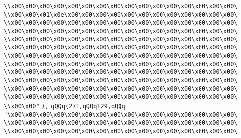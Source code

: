 \verb|\\x00\x00\x00\x00\x00\x00\x00\x00\x00\x00\x00\x00\x00\x00\x00\x00\|\newline
\verb|\\x00\x00\x01\x0e\x00\x00\x00\x00\x00\x00\x00\x00\x00\x00\x00\x00\|\newline
\verb|\\x00\x00\x00\x00\x00\x00\x00\x00\x00\x00\x00\x00\x00\x00\x00\x00\|\newline
\verb|\\x00\x00\x00\x00\x00\x00\x00\x00\x00\x00\x00\x00\x00\x00\x00\x00\|\newline
\verb|\\x00\x00\x00\x00\x00\x00\x00\x00\x00\x00\x00\x00\x00\x00\x00\x00\|\newline
\verb|\\x00\x00\x00\x00\x00\x00\x00\x00\x00\x00\x00\x00\x00\x00\x00\x00\|\newline
\verb|\\x00\x00\x00\x00\x00\x00\x00\x00\x00\x00\x00\x00\x00\x00\x00\x00\|\newline
\verb|\\x00\x00\x00\x00\x00\x00\x00\x00\x00\x00\x00\x00\x00\x00\x00\x00\|\newline
\verb|\\x00\x00\x00\x00\x00\x00\x00\x00\x00\x00\x00\x00\x00\x00\x00\x00\|\newline
\verb|\\x00\x00\x00\x00\x00\x00\x00\x00\x00\x00\x00\x00\x00\x00\x00\x00\|\newline
\verb|\\x00\x00\x00\x00\x00\x00\x00\x00\x00\x00\x00\x00\x00\x00\x00\x00\|\newline
\verb|\\x00\x00\x00\x00\x00\x00\x00\x00\x00\x00\x00\x00\x00\x00\x00\x00\|\newline
\verb|\\x00\x00"|\newline
\verb|),|\newline
\verb|qQQq(271,qQQq129,qQQq|\newline
\verb|"\x00\x00\x00\x00\x00\x00\x00\x00\x00\x00\x00\x00\x00\x00\x00\x00\|\newline
\verb|\\x00\x00\x00\x00\x00\x00\x00\x00\x00\x00\x00\x00\x00\x00\x00\x00\|\newline
\verb|\\x00\x00\x00\x00\x00\x00\x00\x00\x00\x00\x00\x00\x00\x00\x00\x00\|\newline
